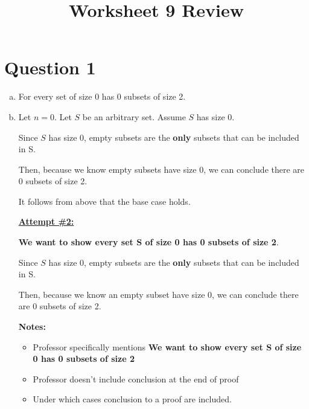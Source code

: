 \documentclass[12pt]{article}
\begin{document}
\title{Worksheet 9 Review}
\maketitle

\section*{Question 1}
\begin{enumerate}[a.]
    \item

    For every set of size 0 has 0 subsets of size 2.

    \item

    Let $n = 0$. Let $S$ be an arbitrary set. Assume $S$ has size 0.

    \bigskip

    Since $S$ has size 0, empty subsets are the \textbf{only} subsets that can be included
    in S.

    \bigskip

    Then, because we know empty subsets have size 0, we can conclude there are 0
    subsets of size 2.

    \bigskip

    It follows from above that the base case holds.


    \begin{mdframed}
        \underline{\textbf{Attempt \#2:}}

        \bigskip

        \color{red}
        \textbf{We want to show every set S of size 0 has 0 subsets of size 2}.
        \color{black}

        \bigskip

        Since $S$ has size 0, empty subsets are the \textbf{only} subsets that can be included
        in S.

        \bigskip

        Then, because we know an empty subset have size 0, we can conclude there are 0
        subsets of size 2.

    \end{mdframed}

    \textbf{Notes:}
    \begin{itemize}
        \item Professor specifically mentions \textbf{We want to show every set
        S of size 0 has 0 subsets of size 2}
        \item Professor doesn't include conclusion at the end of proof
        \item Under which cases conclusion to a proof are included.
    \end{itemize}


\end{enumerate}
\end{document}
